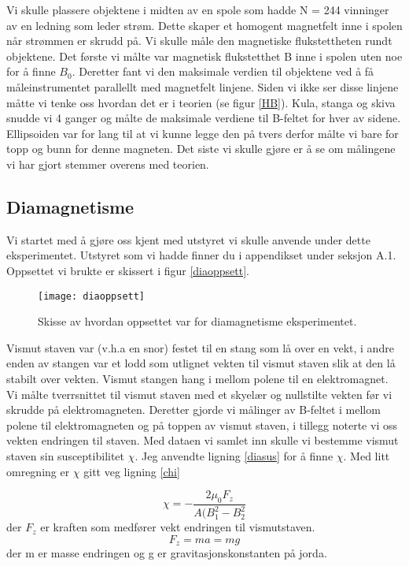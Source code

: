 \documentclass[norsk,a4paper,12pt]{article}
\begin{document}
Vi skulle plassere objektene i midten av en spole som hadde N = 244 vinninger av en ledning som leder strøm. Dette skaper et homogent magnetfelt inne i spolen når strømmen er skrudd på. 
Vi skulle måle den magnetiske flukstettheten rundt objektene. Det første vi målte var magnetisk flukstetthet B inne i spolen uten noe for å finne $B_0$. Deretter fant vi den maksimale verdien til objektene ved å få måleinstrumentet parallellt med magnetfelt linjene. Siden vi ikke ser disse linjene måtte vi tenke oss hvordan det er i teorien (se figur \vref{HB}). Kula, stanga og skiva snudde vi 4 ganger og målte de maksimale verdiene til B-feltet for hver av sidene. Ellipsoiden var for lang til at vi kunne legge den på tvers derfor målte vi bare for topp og bunn for denne magneten.  
Det siste vi skulle gjøre er å se om målingene vi har gjort stemmer overens med teorien.

\subsection{Diamagnetisme}
Vi startet med å gjøre oss kjent med utstyret vi skulle anvende under dette eksperimentet. Utstyret som vi hadde finner du i appendikset under seksjon A.1. Oppsettet vi brukte er skissert i figur \vref{diaoppsett}. 

 \begin{figure}[h!]
	\begin{center}
  	\texttt{[image: diaoppsett]}\\
	\caption[Oppsett til diamagnetisme]{Skisse av hvordan oppsettet var for diamagnetisme eksperimentet.}
	\label{diaoppsett}
	\end{center}
\end{figure}

Vismut staven var (v.h.a en snor) festet til en stang som lå over en vekt, i andre enden av stangen var et lodd som utlignet vekten til vismut staven slik at den lå stabilt over vekten. Vismut stangen hang i mellom polene til en elektromagnet. Vi målte tverrsnittet til vismut staven med et skyelær og nullstilte vekten før vi skrudde på elektromagneten. Deretter gjorde vi målinger av B-feltet i mellom polene til elektromagneten og på toppen av vismut staven, i tillegg noterte vi oss vekten endringen til staven. Med dataen vi samlet inn skulle vi bestemme vismut staven sin susceptibilitet $\chi$. Jeg anvendte ligning \ref{diasus} for å finne $\chi$. Med litt omregning er $\chi$ gitt veg ligning \vref{chi}

\begin{equation}
\chi = -\frac{2\mu_0F_z}{A(B_1^2-B_2^2}
\label{chi}
\end{equation}
der $F_z$ er kraften som medfører vekt endringen til vismutstaven. 
$$
F_z = ma = mg
$$
der m er masse endringen og g er gravitasjonskonstanten på jorda. 
\end{document}
